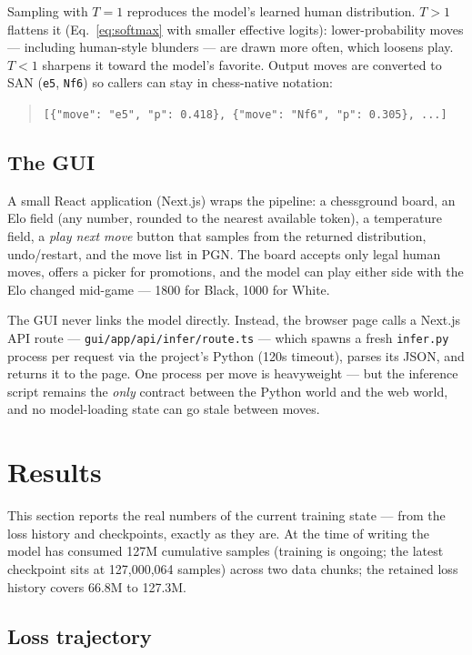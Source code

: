\documentclass[10pt,a4paper]{article}
\newcommand{\code}[1]{\texttt{#1}}
\begin{document}
Sampling with $T=1$ reproduces the model's learned human distribution.
$T>1$ flattens it (Eq.~\eqref{eq:softmax} with smaller effective
logits): lower-probability moves --- including human-style blunders ---
are drawn more often, which loosens play. $T<1$ sharpens it toward the
model's favorite. Output moves are converted to SAN
(\code{e5}, \code{Nf6}) so callers can stay in chess-native notation:
\begin{quote}\small
\code{[\{"move": "e5", "p": 0.418\}, \{"move": "Nf6", "p": 0.305\}, ...]}
\end{quote}

\subsection{The GUI}

A small React application (Next.js) wraps the pipeline: a chessground
board, an Elo field (any number, rounded to the nearest available
token), a temperature field, a \emph{play next move} button that samples
from the returned distribution, undo/restart, and the move list in PGN.
The board accepts only legal human moves, offers a picker for
promotions, and the model can play either side with the Elo changed
mid-game --- 1800 for Black, 1000 for White.

The GUI never links the model directly. Instead, the browser page calls
a Next.js API route --- \verb|gui/app/api/infer/route.ts| --- which
spawns a fresh \code{infer.py} process per request via the project's
Python (120s timeout), parses its JSON, and returns it to the page. One
process per move is heavyweight --- but the inference script remains the
\emph{only} contract between the Python world and the web world, and no
model-loading state can go stale between moves.

\section{Results}\label{sec:results}

This section reports the real numbers of the current training state ---
from the loss history and checkpoints, exactly as they are. At the time
of writing the model has consumed 127M cumulative samples (training is
ongoing; the latest checkpoint sits at 127{,}000{,}064 samples) across
two data chunks; the retained loss history covers 66.8M to 127.3M.

\subsection{Loss trajectory}
\end{document}
